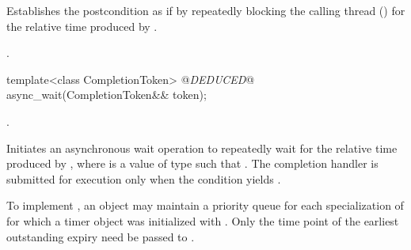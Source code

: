\begin{itemdescr}
\pnum
\effects Establishes the postcondition as if by repeatedly blocking the calling thread () for the relative time produced by .

\pnum
\postconditions {}.
\end{itemdescr}

\begin{itemdecl}
template<class CompletionToken>
  @\textit{DEDUCED}@ async_wait(CompletionToken&& token);
\end{itemdecl}

\begin{itemdescr}
\pnum
\completionsig {}.

\pnum
\effects Initiates an asynchronous wait operation to repeatedly wait for the relative time produced by , where  is a value of type  such that . The completion handler is submitted for execution only when the condition  yields .

\pnum
\enternote To implement , an  object  may maintain a priority queue for each specialization of  for which a timer object was initialized with . Only the time point  of the earliest outstanding expiry need be passed to . \exitnote
\end{itemdescr}




